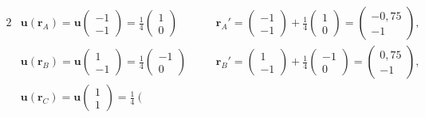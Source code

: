 \documentclass[12pt,a4paper]{scrartcl}
\let\mathbf\bm
\begin{document}
\begin{alignat*}{2}
   & {\mathbf{u}}\left( {{{\mathbf{r}}_A}} \right) = {\mathbf{u}}\left( {\begin{array}{*{20}{c}}
  { - 1} \\ 
  { - 1} 
\end{array}} \right) = \frac{1}{4}\left( {\begin{array}{*{20}{c}}
  1 \\ 
  0 
\end{array}} \right)\quad  && {{\mathbf{r}}_A}' = \left( {\begin{array}{*{20}{c}}
  { - 1} \\ 
  { - 1} 
\end{array}} \right) + \frac{1}{4}\left( {\begin{array}{*{20}{c}}
  1 \\ 
  0 
\end{array}} \right) = \left( {\begin{array}{*{20}{c}}
  { - 0,75} \\ 
  { - 1} 
\end{array}} \right), \\ 
   & {\mathbf{u}}\left( {{{\mathbf{r}}_B}} \right) = {\mathbf{u}}\left( {\begin{array}{*{20}{c}}
  1 \\ 
  { - 1} 
\end{array}} \right) = \frac{1}{4}\left( {\begin{array}{*{20}{c}}
  { - 1} \\ 
  0 
\end{array}} \right)\quad  && {{\mathbf{r}}_B}' = \left( {\begin{array}{*{20}{c}}
  1 \\ 
  { - 1} 
\end{array}} \right) + \frac{1}{4}\left( {\begin{array}{*{20}{c}}
  { - 1} \\ 
  0 
\end{array}} \right) = \left( {\begin{array}{*{20}{c}}
  {0,75} \\ 
  { - 1} 
\end{array}} \right), \\ 
   & {\mathbf{u}}\left( {{{\mathbf{r}}_C}} \right) = {\mathbf{u}}\left( {\begin{array}{*{20}{c}}
  1 \\ 
  1 
\end{array}} \right) = \frac{1}{4}\left( {\begin{array}{*{20}{c}}

\end{array}}
\end{alignat*}
\end{document}
